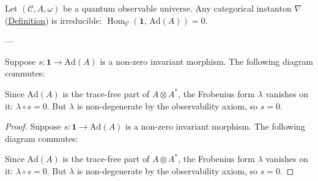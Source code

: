 \begin{lemma}
  \label{lem:categorical-irreducible}
Let $(\mathcal{C}, A, \omega)$ be a quantum observable universe.
Any categorical instanton $\nabla$
(\hyperref[def:categorical-instanton]{Definition}) is irreducible:
$\operatorname{Hom}_{\mathcal{C}}(\mathbf{1},\,\mathrm{Ad}(A)) = 0$.

---

Suppose $s \colon \mathbf{1} \to \mathrm{Ad}(A)$ is a non-zero
invariant morphism.  The following diagram commutes:


Since $\mathrm{Ad}(A)$ is the trace-free part of $A \otimes A^*$,
the Frobenius form $\lambda$ vanishes on it:
$\lambda \circ s = 0$.  But $\lambda$ is non-degenerate by the
observability axiom, so $s = 0$.
\end{lemma}
\begin{proof}
Suppose $s \colon \mathbf{1} \to \mathrm{Ad}(A)$ is a non-zero
invariant morphism.  The following diagram commutes:


Since $\mathrm{Ad}(A)$ is the trace-free part of $A \otimes A^*$,
the Frobenius form $\lambda$ vanishes on it:
$\lambda \circ s = 0$.  But $\lambda$ is non-degenerate by the
observability axiom, so $s = 0$.
\end{proof}

